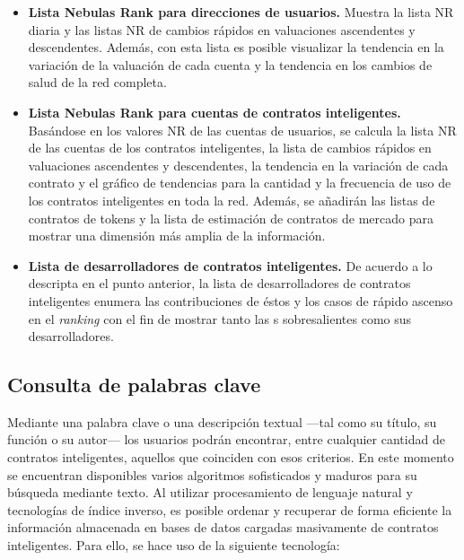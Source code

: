 \begin{itemize}
\item \textbf{Lista Nebulas Rank para direcciones de usuarios.} Muestra la lista NR diaria y las listas NR de cambios rápidos en valuaciones ascendentes y descendentes. Además, con esta lista es posible visualizar la tendencia en la variación de la valuación de cada cuenta y la tendencia en los cambios de salud de la red completa.

\item \textbf{Lista Nebulas Rank para cuentas de contratos inteligentes.} Basándose en los valores NR de las cuentas de usuarios, se calcula la lista NR de las cuentas de los contratos inteligentes, la lista de cambios rápidos en valuaciones ascendentes y descendentes, la tendencia en la variación de cada contrato y el gráfico de tendencias para la cantidad y la frecuencia de uso de los contratos inteligentes en toda la red. Además, se añadirán las listas de contratos de tokens y la lista de estimación de contratos de mercado para mostrar una dimensión más amplia de la información.

\item \textbf{Lista de desarrolladores de contratos inteligentes.} De acuerdo a lo descripta en el punto anterior, la lista de desarrolladores de contratos inteligentes enumera las contribuciones de éstos y los casos de rápido ascenso en el \textit{ranking} con el fin de mostrar tanto las {\dapp}s sobresalientes como sus desarrolladores.

\end{itemize}

\subsection{Consulta de palabras clave}

Mediante una palabra clave o una descripción textual —tal como su título, su función o su autor— los usuarios podrán encontrar, entre cualquier cantidad de contratos inteligentes, aquellos que coinciden con esos criterios. En este momento se encuentran disponibles varios algoritmos sofisticados y maduros para su búsqueda mediante texto. Al utilizar procesamiento de lenguaje natural y tecnologías de índice inverso, es posible ordenar y recuperar de forma eficiente la información almacenada en bases de datos cargadas masivamente de contratos inteligentes. Para ello, se hace uso de la siguiente tecnología:

